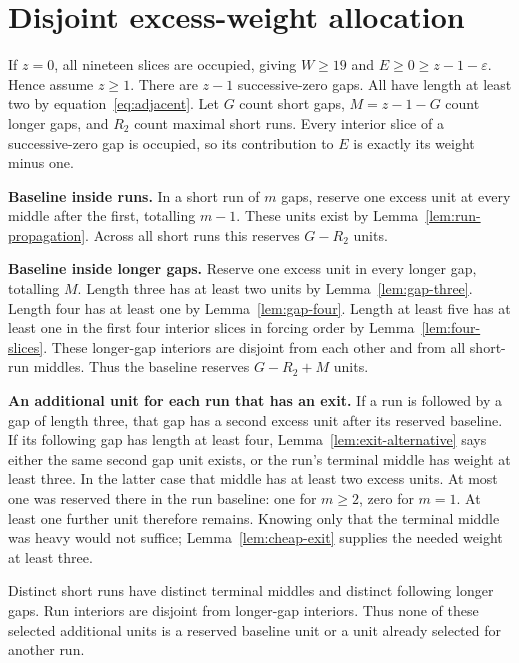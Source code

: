 \documentclass{article}
\begin{document}
\section{Disjoint excess-weight allocation}\label{sec:accounting}

If \(z = 0\), all nineteen slices are occupied, giving \(W \ge 19\) and
\(E \ge 0 \ge z - 1 - \varepsilon\). Hence assume \(z \ge 1\). There are \(z - 1\)
successive-zero gaps. All have length at least two by equation~\eqref{eq:adjacent}. Let \(G\)
count short gaps, \(M = z - 1 - G\) count longer gaps, and \(R_2\) count maximal short runs.
Every interior slice of a successive-zero gap is occupied, so its contribution
to \(E\) is exactly its weight minus one.

\textbf{Baseline inside runs.} In a short run of \(m\) gaps, reserve one excess
unit at every middle after the first, totalling \(m - 1\). These units exist by
Lemma~\ref{lem:run-propagation}. Across all short runs this reserves \(G - R_2\) units.

\textbf{Baseline inside longer gaps.} Reserve one excess unit in every longer
gap, totalling \(M\). Length three has at least two units by Lemma~\ref{lem:gap-three}.
Length four has at least one by Lemma~\ref{lem:gap-four}. Length at least five has at least
one in the first four interior slices in forcing order by Lemma~\ref{lem:four-slices}.
These longer-gap interiors are disjoint from each other and from all
short-run middles. Thus the baseline reserves \(G - R_2 + M\) units.

\textbf{An additional unit for each run that has an exit.} If a run is followed
by a gap of length three, that gap has a second excess unit after its
reserved baseline. If its following gap has length at least four,
Lemma~\ref{lem:exit-alternative} says either the same second gap unit exists, or the run's
terminal middle has weight at least three. In the latter case that middle has at least two
excess units. At most one was reserved there in the run baseline: one for
\(m \ge 2\), zero for \(m = 1\). At least one further unit therefore remains.
Knowing only that the terminal middle was heavy would not suffice;
Lemma~\ref{lem:cheap-exit} supplies the needed weight at least three.

Distinct short runs have distinct terminal middles and distinct following
longer gaps. Run interiors are disjoint from longer-gap interiors.
Thus none of these selected additional units is a reserved baseline unit
or a unit already selected for another run.
\end{document}
